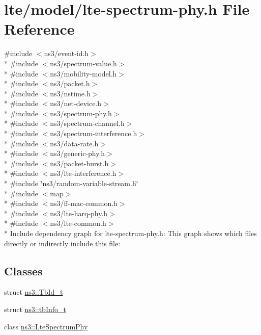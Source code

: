 \hypertarget{lte-spectrum-phy_8h}{}\section{lte/model/lte-\/spectrum-\/phy.h File Reference}
\label{lte-spectrum-phy_8h}
{\ttfamily \#include $<$ns3/event-\/id.\+h$>$}\\*
{\ttfamily \#include $<$ns3/spectrum-\/value.\+h$>$}\\*
{\ttfamily \#include $<$ns3/mobility-\/model.\+h$>$}\\*
{\ttfamily \#include $<$ns3/packet.\+h$>$}\\*
{\ttfamily \#include $<$ns3/nstime.\+h$>$}\\*
{\ttfamily \#include $<$ns3/net-\/device.\+h$>$}\\*
{\ttfamily \#include $<$ns3/spectrum-\/phy.\+h$>$}\\*
{\ttfamily \#include $<$ns3/spectrum-\/channel.\+h$>$}\\*
{\ttfamily \#include $<$ns3/spectrum-\/interference.\+h$>$}\\*
{\ttfamily \#include $<$ns3/data-\/rate.\+h$>$}\\*
{\ttfamily \#include $<$ns3/generic-\/phy.\+h$>$}\\*
{\ttfamily \#include $<$ns3/packet-\/burst.\+h$>$}\\*
{\ttfamily \#include $<$ns3/lte-\/interference.\+h$>$}\\*
{\ttfamily \#include \char`\"{}ns3/random-\/variable-\/stream.\+h\char`\"{}}\\*
{\ttfamily \#include $<$map$>$}\\*
{\ttfamily \#include $<$ns3/ff-\/mac-\/common.\+h$>$}\\*
{\ttfamily \#include $<$ns3/lte-\/harq-\/phy.\+h$>$}\\*
{\ttfamily \#include $<$ns3/lte-\/common.\+h$>$}\\*
Include dependency graph for lte-\/spectrum-\/phy.h\+:
This graph shows which files directly or indirectly include this file\+:
\subsection*{Classes}
\begin{DoxyCompactItemize}
\item 
struct \hyperlink{structns3_1_1TbId__t}{ns3\+::\+Tb\+Id\+\_\+t}
\item 
struct \hyperlink{structns3_1_1tbInfo__t}{ns3\+::tb\+Info\+\_\+t}
\item 
class \hyperlink{classns3_1_1LteSpectrumPhy}{ns3\+::\+Lte\+Spectrum\+Phy}
\end{DoxyCompactItemize}
